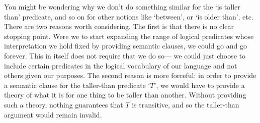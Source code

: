 You might be wondering why we don't do something similar for the `is taller than' predicate, and so on for other notions like `between', or `is older than', etc.
There are two reasons worth considering.
The first is that there is no clear stopping point.
Were we to start expanding the range of logical predicates whose interpretation we hold fixed by providing semantic clauses, we could go and go forever.
This in itself does not require that we do so--- we could just choose to include certain predicates in the logical vocabulary of our language and not others given our purposes.
The second reason is more forceful: in order to provide a semantic clause for the taller-than predicate `$T$', we would have to provide a theory of what it is for one thing to be taller than another.
Without providing such a theory, nothing guarantees that $T$ is transitive, and so the taller-than argument would remain invalid. 

%


